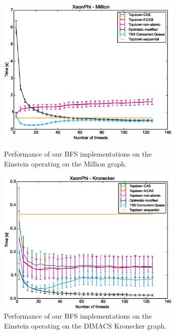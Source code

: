 \documentclass[letterpaper]{article}
\begin{document}
		\begin{figure}
			\centering
			\begin{minipage}{.5\textwidth}
				\centering
	  			\includegraphics[width=0.8\textwidth]{einstein_million.eps}
	  			\vspace*{-0.3cm}
	  			\caption[caption]{Performance of our BFS implementations on the \\ \hspace{\textwidth} Einstein operating on the Million graph.\label{fig:einsteinbig}}
			\end{minipage}%
			\begin{minipage}{.5\textwidth}
				\centering
	  			\includegraphics[width=0.8\textwidth]{einstein_dimacskron.eps}
	  			\vspace*{-0.3cm}
	  			\caption[caption]{Performance of our BFS implementations on the \\ \hspace{\textwidth} Einstein operating on the DIMACS Kronecker graph.\label{fig:einsteinkron}}
			\end{minipage}%
		\end{figure}
		
\end{document}
